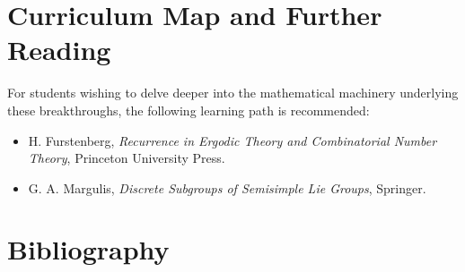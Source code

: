 \section{Curriculum Map and Further Reading}
For students wishing to delve deeper into the mathematical machinery underlying these breakthroughs, the following learning path is recommended:
\begin{itemize}
  \item H. Furstenberg, \emph{Recurrence in Ergodic Theory and Combinatorial Number Theory}, Princeton University Press.
  \item G. A. Margulis, \emph{Discrete Subgroups of Semisimple Lie Groups}, Springer.
\end{itemize}

\section*{Bibliography}

